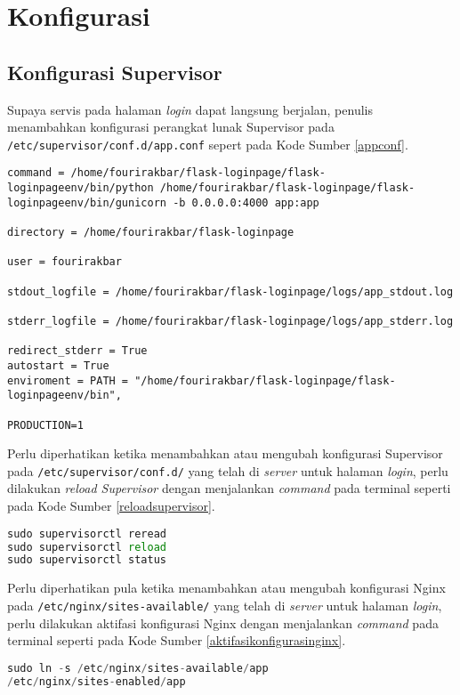 \chapter{Konfigurasi}

\section*{Konfigurasi Supervisor}

Supaya servis pada halaman \textit{login} dapat langsung berjalan, penulis menambahkan konfigurasi perangkat lunak Supervisor pada \texttt{/etc/supervisor/conf.d/app.conf} sepert pada Kode Sumber \ref{appconf}. 

\begin{lstlisting}[frame=single,tabsize=2,breaklines,caption={Isi Berkas app.conf},label=appconf, captionpos=b]
command = /home/fourirakbar/flask-loginpage/flask-loginpageenv/bin/python /home/fourirakbar/flask-loginpage/flask-loginpageenv/bin/gunicorn -b 0.0.0.0:4000 app:app

directory = /home/fourirakbar/flask-loginpage

user = fourirakbar

stdout_logfile = /home/fourirakbar/flask-loginpage/logs/app_stdout.log

stderr_logfile = /home/fourirakbar/flask-loginpage/logs/app_stderr.log

redirect_stderr = True
autostart = True
enviroment = PATH = "/home/fourirakbar/flask-loginpage/flask-loginpageenv/bin", 

PRODUCTION=1
\end{lstlisting}

Perlu diperhatikan ketika menambahkan atau mengubah konfigurasi Supervisor pada \texttt{/etc/supervisor/conf.d/} yang telah di \textit{server} untuk halaman \textit{login}, perlu dilakukan \textit{reload Supervisor} dengan menjalankan \textit{command} pada terminal seperti pada Kode Sumber \ref{reloadsupervisor}.
\begin{lstlisting}[frame=single,tabsize=2,breaklines,caption=Command untuk Reload Supervisor,language=Python,label=reloadsupervisor,captionpos=b]
sudo supervisorctl reread
sudo supervisorctl reload
sudo supervisorctl status
\end{lstlisting}

Perlu diperhatikan pula ketika menambahkan atau mengubah konfigurasi Nginx pada \texttt{/etc/nginx/sites-available/} yang telah di \textit{server} untuk halaman \textit{login}, perlu dilakukan aktifasi konfigurasi Nginx dengan menjalankan \textit{command} pada terminal seperti pada Kode Sumber \ref{aktifasikonfigurasinginx}.
\begin{lstlisting}[frame=single,tabsize=2,breaklines,caption=Command untuk mengaktifkan konfigurasi Nginx,language=Python,label=aktifasikonfigurasinginx,captionpos=b]
sudo ln -s /etc/nginx/sites-available/app 
/etc/nginx/sites-enabled/app
\end{lstlisting}

